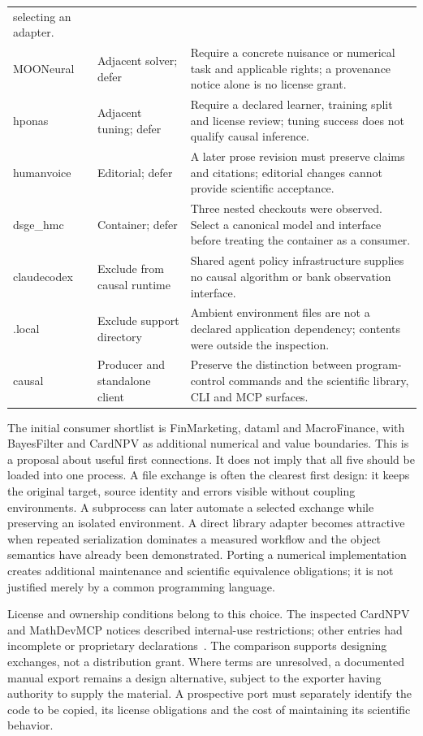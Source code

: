 \begin{longtable}{P{.21\linewidth}P{.23\linewidth}P{.47\linewidth}}
selecting an adapter. \\
MOONeural & Adjacent solver; defer & Require a concrete nuisance or numerical
task and applicable rights; a provenance notice alone is no license grant. \\
hponas & Adjacent tuning; defer & Require a declared learner, training split
and license review; tuning success does not qualify causal inference. \\
humanvoice & Editorial; defer & A later prose revision must preserve claims
and citations; editorial changes cannot provide scientific acceptance. \\
dsge\_hmc & Container; defer & Three nested checkouts were observed. Select a
canonical model and interface before treating the container as a consumer. \\
claudecodex & Exclude from causal runtime & Shared agent policy infrastructure
supplies no causal algorithm or bank observation interface. \\
.local & Exclude support directory & Ambient environment files are not a
declared application dependency; contents were outside the inspection. \\
causal & Producer and standalone client & Preserve the distinction between
program-control commands and the scientific library, CLI and MCP surfaces. \\
\bottomrule
\end{longtable}

The initial consumer shortlist is FinMarketing, dataml and MacroFinance,
with BayesFilter and CardNPV as additional numerical and value boundaries.
This is a proposal about useful first connections. It does not imply that all
five should be loaded into one process. A file exchange is often the clearest
first design: it keeps the original target, source identity and errors visible
without coupling environments. A subprocess can later automate a selected
exchange while preserving an isolated environment. A direct library adapter
becomes attractive when repeated serialization dominates a measured workflow
and the object semantics have already been demonstrated. Porting a numerical
implementation creates additional maintenance and scientific equivalence
obligations; it is not justified merely by a common programming language.

License and ownership conditions belong to this choice. The inspected
CardNPV and MathDevMCP notices described internal-use restrictions; other
entries had incomplete or proprietary declarations~\citep{v12_in_inventory}.
The comparison supports designing exchanges, not a distribution grant.
Where terms are unresolved, a documented manual export remains a design
alternative, subject to the exporter having authority to supply the material.
A prospective port must separately identify the code to be copied, its
license obligations and the cost of maintaining its scientific behavior.

